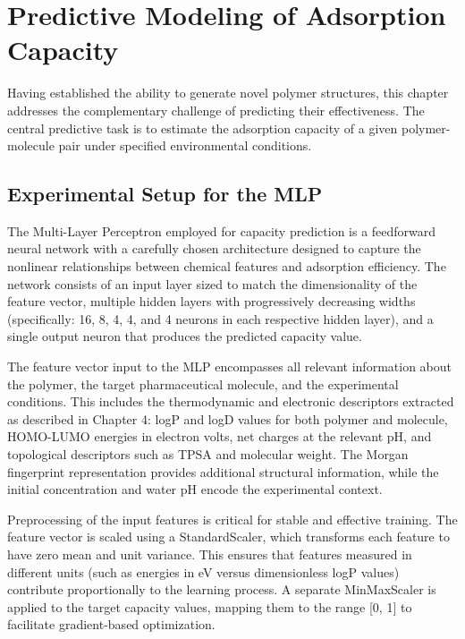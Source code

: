 \chapter{Predictive Modeling of Adsorption Capacity}
\label{chap5}

Having established the ability to generate novel polymer structures, this chapter addresses the complementary challenge of predicting their effectiveness. The central predictive task is to estimate the adsorption capacity of a given polymer-molecule pair under specified environmental conditions.

\section{Experimental Setup for the MLP}
\label{sec:mlp_setup}

The Multi-Layer Perceptron employed for capacity prediction is a feedforward neural network with a carefully chosen architecture designed to capture the nonlinear relationships between chemical features and adsorption efficiency. The network consists of an input layer sized to match the dimensionality of the feature vector, multiple hidden layers with progressively decreasing widths (specifically: 16, 8, 4, 4, and 4 neurons in each respective hidden layer), and a single output neuron that produces the predicted capacity value.

The feature vector input to the MLP encompasses all relevant information about the polymer, the target pharmaceutical molecule, and the experimental conditions. This includes the thermodynamic and electronic descriptors extracted as described in Chapter 4: logP and logD values for both polymer and molecule, HOMO-LUMO energies in electron volts, net charges at the relevant pH, and topological descriptors such as TPSA and molecular weight. The Morgan fingerprint representation provides additional structural information, while the initial concentration and water pH encode the experimental context.

Preprocessing of the input features is critical for stable and effective training. The feature vector is scaled using a StandardScaler, which transforms each feature to have zero mean and unit variance. This ensures that features measured in different units (such as energies in eV versus dimensionless logP values) contribute proportionally to the learning process. A separate MinMaxScaler is applied to the target capacity values, mapping them to the range [0, 1] to facilitate gradient-based optimization.

